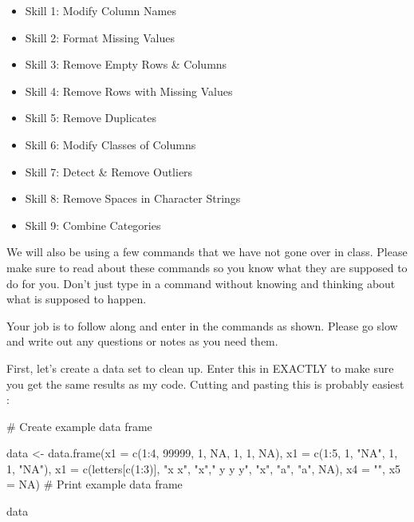 \documentclass[
  letterpaper,
  DIV=11,
  numbers=noendperiod]{scrreprt}
\newenvironment{Shaded}{\begin{snugshade}}{\end{snugshade}}
\newcommand{\AttributeTok}[1]{\textcolor[rgb]{0.40,0.45,0.13}{#1}}
\newcommand{\CommentTok}[1]{\textcolor[rgb]{0.37,0.37,0.37}{#1}}
\newcommand{\ConstantTok}[1]{\textcolor[rgb]{0.56,0.35,0.01}{#1}}
\newcommand{\DecValTok}[1]{\textcolor[rgb]{0.68,0.00,0.00}{#1}}
\newcommand{\FunctionTok}[1]{\textcolor[rgb]{0.28,0.35,0.67}{#1}}
\newcommand{\NormalTok}[1]{\textcolor[rgb]{0.00,0.23,0.31}{#1}}
\newcommand{\OtherTok}[1]{\textcolor[rgb]{0.00,0.23,0.31}{#1}}
\newcommand{\SpecialCharTok}[1]{\textcolor[rgb]{0.37,0.37,0.37}{#1}}
\newcommand{\StringTok}[1]{\textcolor[rgb]{0.13,0.47,0.30}{#1}}
\providecommand{\tightlist}{%
  \setlength{\itemsep}{0pt}\setlength{\parskip}{0pt}}\usepackage{longtable,booktabs,array}
\begin{document}
\begin{itemize}
\tightlist
\item
  Skill 1: Modify Column Names
\item
  Skill 2: Format Missing Values
\item
  Skill 3: Remove Empty Rows \& Columns
\item
  Skill 4: Remove Rows with Missing Values
\item
  Skill 5: Remove Duplicates
\item
  Skill 6: Modify Classes of Columns
\item
  Skill 7: Detect \& Remove Outliers
\item
  Skill 8: Remove Spaces in Character Strings
\item
  Skill 9: Combine Categories
\end{itemize}

We will also be using a few commands that we have not gone over in
class. Please make sure to read about these commands so you know what
they are supposed to do for you. Don't just type in a command without
knowing and thinking about what is supposed to happen.

Your job is to follow along and enter in the commands as shown. Please
go slow and write out any questions or notes as you need them.

First, let's create a data set to clean up. Enter this in EXACTLY to
make sure you get the same results as my code. Cutting and pasting this
is probably easiest :

\begin{Shaded}
\begin{Highlighting}[]
\CommentTok{\# Create example data frame}

\NormalTok{data }\OtherTok{\textless{}{-}} \FunctionTok{data.frame}\NormalTok{(}\AttributeTok{x1 =} \FunctionTok{c}\NormalTok{(}\DecValTok{1}\SpecialCharTok{:}\DecValTok{4}\NormalTok{, }\DecValTok{99999}\NormalTok{, }\DecValTok{1}\NormalTok{, }\ConstantTok{NA}\NormalTok{, }\DecValTok{1}\NormalTok{, }\DecValTok{1}\NormalTok{, }\ConstantTok{NA}\NormalTok{),}
                   \AttributeTok{x1 =} \FunctionTok{c}\NormalTok{(}\DecValTok{1}\SpecialCharTok{:}\DecValTok{5}\NormalTok{, }\DecValTok{1}\NormalTok{, }\StringTok{"NA"}\NormalTok{, }\DecValTok{1}\NormalTok{, }\DecValTok{1}\NormalTok{, }\StringTok{"NA"}\NormalTok{),}
                   \AttributeTok{x1 =} \FunctionTok{c}\NormalTok{(letters[}\FunctionTok{c}\NormalTok{(}\DecValTok{1}\SpecialCharTok{:}\DecValTok{3}\NormalTok{)], }\StringTok{"x x"}\NormalTok{, }\StringTok{"x"}\NormalTok{,}\StringTok{" y y y"}\NormalTok{, }\StringTok{"x"}\NormalTok{, }\StringTok{"a"}\NormalTok{, }\StringTok{"a"}\NormalTok{, }\ConstantTok{NA}\NormalTok{),}
                   \AttributeTok{x4 =} \StringTok{""}\NormalTok{,}
                   \AttributeTok{x5 =} \ConstantTok{NA}\NormalTok{)}
\CommentTok{\# Print example data frame}

\NormalTok{data}
\end{Highlighting}
\end{Shaded}
\end{document}
